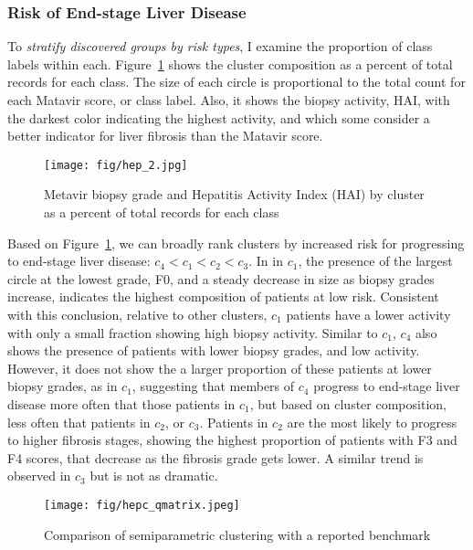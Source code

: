 \subsubsection{Risk of End-stage Liver Disease}
\label{risk}
To \emph{stratify discovered groups by risk types}, I examine the proportion of class labels within each.  Figure~\ref{hep_2} shows the cluster composition as a percent of total records for each class.  The size of each circle is proportional to the total count for each Matavir score, or class label. Also, it shows the biopsy activity, HAI, with the darkest color indicating the highest activity, and which some consider a better indicator for liver fibrosis than the Matavir score.

\begin{figure}[t]
\vskip 0.2in
\begin{center}
\centerline{\texttt{[image: fig/hep\_2.jpg]}}
\caption{Metavir biopsy grade and Hepatitis Activity Index (HAI) by cluster as a percent of total records for each class}
\label{hep_2}
\end{center}
\vskip -0.2in
\end{figure}

Based on Figure~\ref{hep_2}, we can broadly rank clusters by increased risk for progressing to end-stage liver disease: $c_4 < c_1 < c_2 < c_3$.  In in $c_1$, the presence of the largest circle at the lowest grade, F0, and a steady decrease in size as biopsy grades increase, indicates the highest composition of patients at low risk.  Consistent with this conclusion, relative to other clusters, $c_1$ patients have a lower activity with only a small fraction showing high biopsy activity.  Similar to $c_1$, $c_4$ also shows the presence of patients with lower biopsy grades, and low activity.  However, it does not show the a larger proportion of these patients at lower biopsy grades, as in $c_1$, suggesting that members of $c_4$ progress to end-stage liver disease more often that those patients in $c_1$, but based on cluster composition, less often that patients in $c_2$, or $c_3$.  Patients in $c_2$ are the most likely to progress to higher fibrosis stages, showing the highest proportion of patients with F3 and F4 scores, that decrease as the fibrosis grade gets lower.  A similar trend is observed in $c_3$ but is not as dramatic.

\begin{figure}[ht!]
\vskip 0.2in
\begin{center}
\centerline{\texttt{[image: fig/hepc\_qmatrix.jpeg]}}
\caption{Comparison of semiparametric clustering with a reported benchmark}
\label{hepCqmatrix}
\end{center}
\vskip -0.2in
\end{figure}

